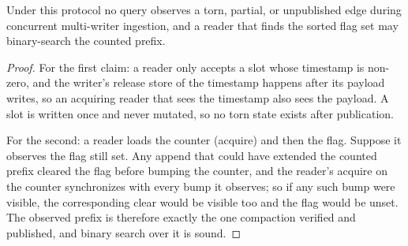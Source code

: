 \documentclass[sigconf,nonacm]{acmart}
\begin{document}
\begin{algorithm}[t]
\small
\DontPrintSemicolon
{}
\Fn{\textsc{Expand}$(v, t_{lo}, t_{hi})$}{
  \ForEach{bucket $u$ of $v$}{
    $n \leftarrow u.\mathit{count}$ \hfill \textsf{(acquire)}\;
    \lIf{$u.\mathit{sorted}$ \textsf{(acquire)}}{binary-search $u[0..n)$ on the inline $t$}
    \lElse{scan $u[0..n)$, skipping entries whose block pointer is $\bot$}
  }
}
\caption{\small Publication protocol.}
\label{alg:publish}
\end{algorithm}

\begin{theorem}
\label{thm:conc}
Under this protocol no query observes a torn, partial, or unpublished
edge during concurrent multi-writer ingestion, and a reader that finds
the sorted flag set may binary-search the counted prefix.
\end{theorem}
\begin{proof}
For the first claim: a reader only accepts a slot whose timestamp is
non-zero, and the writer's release store of the timestamp happens
after its payload writes, so an acquiring reader that sees the
timestamp also sees the payload. A slot is written once and never
mutated, so no torn state exists after publication.

For the second: a reader loads the counter (acquire) and then the
flag. Suppose it observes the flag still set. Any append that could
have extended the counted prefix cleared the flag before bumping the
counter, and the reader's acquire on the counter synchronizes with
every bump it observes; so if any such bump were visible, the
corresponding clear would be visible too and the flag would be unset.
The observed prefix is therefore exactly the one compaction verified
and published, and binary search over it is sound.
\end{proof}
\end{document}
